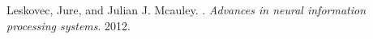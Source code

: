 \begin{thebibliography}{1}
	Leskovec, Jure, and Julian J. Mcauley. 
	.
	\textit{Advances in neural information processing systems}. 
	2012.
\end{thebibliography}

